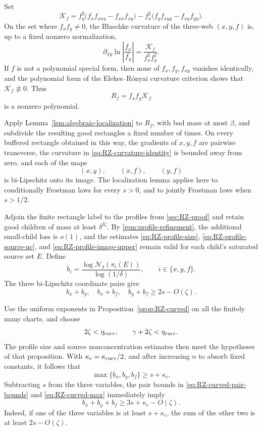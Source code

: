 \documentclass[11pt]{article}
\begin{document}
Set
\begin{equation}
 \mathcal K_f
 =f_y^2\bigl(f_xf_{xxy}-f_{xx}f_{xy}\bigr)
  -f_x^2\bigl(f_yf_{xyy}-f_{xy}f_{yy}\bigr).
 \label{eq:RZ-curvature-numerator}
\end{equation}
On the set where \(f_xf_y\ne0\), the Blaschke curvature of the
three-web \((x,y,f)\) is, up to a fixed nonzero normalization,
\begin{equation}
 \partial_{xy}\ln\left|\frac{f_x}{f_y}\right|
 =\frac{\mathcal K_f}{f_x^2f_y^2}.
 \label{eq:RZ-curvature-identity}
\end{equation}
If \(f\) is not a polynomial special form, then none of
\(f_x,f_y,f_{xy}\) vanishes identically, and the polynomial form of
the Elekes--R\'onyai curvature criterion
\cite[Lemma~3.3]{RZ} shows that
\(\mathcal K_f\not\equiv0\).  Thus
\[
 R_f=f_xf_y\mathcal K_f
\]
is a nonzero polynomial.

Apply Lemma~\ref{lem:algebraic-localization} to \(R_f\), with bad
mass at most \(\beta\), and subdivide the resulting good rectangles
a fixed number of times.  On every buffered rectangle obtained in
this way, the gradients of \(x,y,f\) are pairwise transverse, the
curvature in \eqref{eq:RZ-curvature-identity} is bounded away from
zero, and each of the maps
\[
 (x,y),\qquad (x,f),\qquad (y,f)
\]
is bi-Lipschitz onto its image.  The localization lemma applies here
to conditionally Frostman laws for every \(s>0\), and to jointly
Frostman laws when \(s>1/2\).

Adjoin the finite rectangle label to the profiles from
\cref{sec:RZ-proof} and retain good children of mass at least
\(\delta^{2\zeta}\).  By \cref{rem:profile-refinement}, the
additional small-child loss is \(o(1)\), and the estimates
\eqref{eq:RZ-profile-size}, \eqref{eq:RZ-profile-source-nc}, and
\eqref{eq:RZ-profile-image-upper} remain valid for each child's
saturated source set \(E\).  Define
\[
 b_i=\frac{\log\mathcal N_\delta(\pi_i(E))}{\log(1/\delta)},
 \qquad i\in\{x,y,f\}.
\]
The three bi-Lipschitz coordinate pairs give
\begin{equation}
 b_x+b_y,\quad b_x+b_f,\quad b_y+b_f
 \ge2s-O(\zeta).
 \label{eq:RZ-curved-pair-bounds}
\end{equation}

Use the uniform exponents in
Proposition~\ref{prop:RZ-curved} on all the finitely many charts, and
choose
\[
 2\zeta<\eta_{\rm curv},
 \qquad \gamma+2\zeta<\eta_{\rm curv}.
\]
The profile size and source nonconcentration estimates then meet the
hypotheses of that proposition.  With
\(\kappa_c=\kappa_{\rm curv}/2\), and after increasing \(n\) to
absorb fixed constants, it follows that
\begin{equation}
 \max\{b_x,b_y,b_f\}\ge s+\kappa_c.
 \label{eq:RZ-curved-max}
\end{equation}
Subtracting \(s\) from the three variables, the pair bounds in
\eqref{eq:RZ-curved-pair-bounds} and
\eqref{eq:RZ-curved-max} immediately imply
\begin{equation}
 b_x+b_y+b_f\ge3s+\kappa_c-O(\zeta).
 \label{eq:RZ-curved-LP}
\end{equation}
Indeed, if one of the three variables is at least
\(s+\kappa_c\), the sum of the other two is at least
\(2s-O(\zeta)\).
\end{document}
